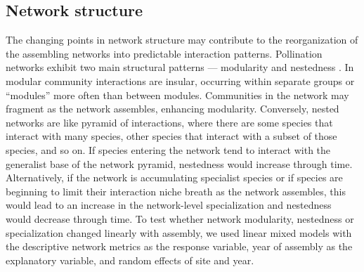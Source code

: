 \documentclass[12pt]{article}
\begin{document}
\subsection*{Network structure}

The changing points in network structure may contribute to the
reorganization of the assembling networks into predictable interaction
patterns. Pollination networks exhibit two main structural patterns ---
modularity \citep[e.g.,][]{Olesen2007} and nestedness
\citep[e.g.,][]{Bascompte2006, Bascompte2003}. In modular community
interactions are insular, occurring within separate groups or
``modules'' more often than between modules. Communities in the
network may fragment as the network assembles, enhancing
modularity. Conversely, nested networks are like pyramid of
interactions, where there are some species that interact with many
species, other species that interact with a subset of those species,
and so on. If species entering the network tend to interact with the
generalist base of the network pyramid, nestedness would increase
through time. Alternatively, if the network is accumulating specialist %
species or if species are beginning to limit their interaction niche
breath as the network assembles, this would lead to an increase in the
network-level specialization \citep{bluthgen-2006-9} and nestedness would decrease
through time. To test whether
network modularity, nestedness or specialization changed linearly with
assembly, we used linear mixed models with the descriptive network
metrics as the response variable, year of assembly as the explanatory
variable, and random effects of site and year.
\end{document}
